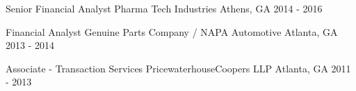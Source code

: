 
\begin{cventries}
  \cventry
    {Senior Financial Analyst} %
    {Pharma Tech Industries} %
    {Athens, GA} %
    {2014 - 2016} %
    {
      \begin{cvitems} %
      \end{cvitems}
    }

  \vspace{-4.5mm}

  \cventry
    {Financial Analyst} %
    {Genuine Parts Company / NAPA Automotive} %
    {Atlanta, GA} %
    {2013 - 2014} %
    {
      \begin{cvitems} %
      \end{cvitems}
    }

  \vspace{-4.5mm}

  \cventry
    {Associate - Transaction Services} %
    {PricewaterhouseCoopers LLP} %
    {Atlanta, GA} %
    {2011 - 2013} %
    {
      \begin{cvitems} %
      \end{cvitems}
    }

\end{cventries}
